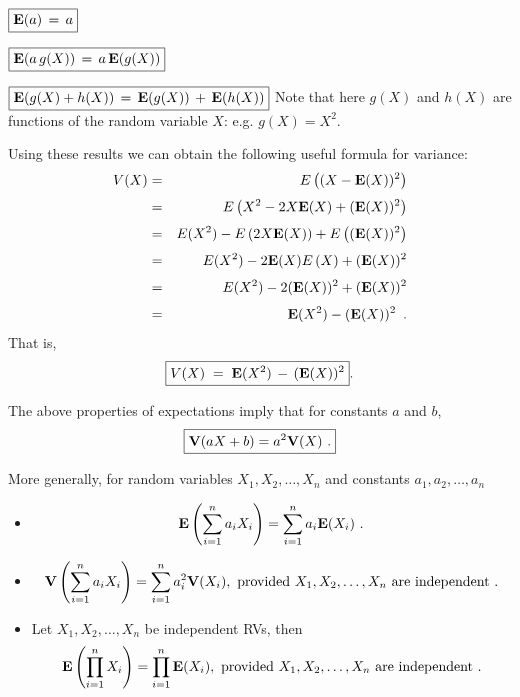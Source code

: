 \bit
\item[] $\boxed{\mathbf{E}(a ) \,=\, a}$

\item[] $\boxed{\mathbf{E}(a \,g(X)) \,=\, a\, \mathbf{E}(g(X))}$

\item[] $\boxed{\mathbf{E}(g(X)+h(X))  \,=\, \mathbf{E}(g(X)) \,+\, \mathbf{E}(h(X))}$
\eit
Note that here  $g(X)$ and $h(X)$ are functions of the random variable
$X$: e.g.  $g(X)=X^2$.

Using these results we can obtain the following useful formula for variance:
\begin{eqnarray*}
V(X)
&=& E\left((X-\mathbf{E}(X))^2\right)\\[3pt]
& =& E \left( X^2 - 2 X \mathbf{E}(X) + (\mathbf{E}(X))^2 \right) \\[3pt]
&=& E ( X^2) - E \left( 2 X \mathbf{E}(X) \right) + E \left( (\mathbf{E}(X))^2
\right)\\[3pt]
& =& E ( X^2) - 2 \mathbf{E}(X) E \left( X \right) + (\mathbf{E}(X))^2 \\[3pt]
&=& E ( X^2) - 2 (\mathbf{E}(X))^2 + (\mathbf{E}(X))^2\\[3pt]
&=& \mathbf{E}(X^2) - (\mathbf{E}(X))^2 \enspace .
\end{eqnarray*}
That is, \[
\boxed{
V(X) \;=\; \mathbf{E}(X^2) \,- \,(\mathbf{E}(X))^2
}.
\]

The above properties of expectations imply that for constants $a$ and $b$,
\begin{equation}\label{E:VofAffineofRVs}
\boxed{
\mathbf{V}(aX+b) = a^2\mathbf{V}(X) \ . 
}
\end{equation}

More generally, for random variables $X_1,X_2,\ldots,X_n$ and constants $a_1,a_2,\ldots,a_n$
\begin{itemize}
\item
\begin{equation}\label{E:EofLinCombofRVs}
\e \left( \sum_{i=1}^n a_i X_i \right) = \sum_{i=1}^n a_i \e(X_i) \ .
\end{equation}
\item
\begin{equation}\label{E:VofLinCombofRVs}
\V \left(  \sum_{i=1}^n a_i X_i \right) = \sum_{i=1}^n a_i^2 \V(X_i) , \text{ provided $X_1,X_2,\ldots,X_n$ are independent}\ .
\end{equation}
\item Let $X_1,X_2,\ldots,X_n$ be independent RVs, then
\begin{equation}\label{E:EofProdIndRVs}
\mathbf{E} \left(  \prod_{i=1}^n X_i \right) = \prod_{i=1}^{n} \mathbf{E}(X_i) , \text{ provided $X_1,X_2,\ldots,X_n$ are independent}\ .
\end{equation}
\end{itemize}

